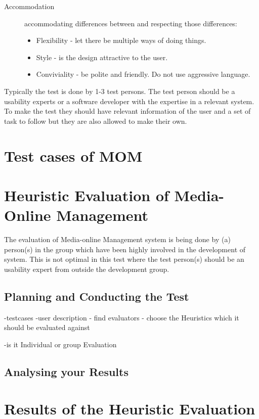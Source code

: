 \begin{description}
\item[Accommodation] accommodating differences between and respecting those differences:
\begin{itemize}
	\item Flexibility - let there be multiple ways of doing things.%
	\item Style - is the design attractive to the user. %
	\item Conviviality - be polite and friendly. Do not use aggressive language.
\end{itemize}
\end{description}

Typically the test is done by 1-3 test persons\citep{HeuristicEvaluation}. The test person should be a usability experts or a software developer with the expertise in a relevant system. To make the test they should have relevant information of the user and a set of task to follow but they are also allowed to make their own.


\section{Test cases of MOM} %


\section{Heuristic Evaluation of Media-Online Management}
The evaluation of Media-online Management system is being done by (a) person(s) in the group which have been highly involved in the development of system. This is not optimal in this test where the test person(s) should be an usability expert from outside the development group.

\subsection{Planning and Conducting the Test}
-testcases
-user description
- find evaluators
- choose the Heuristics which it should be evaluated against

-is it Individual or group Evaluation

\subsection{Analysing your Results}

\section{Results of the Heuristic Evaluation}